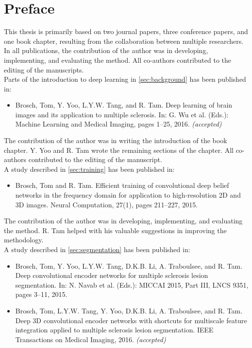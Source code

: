 \chapter*{Preface}

This thesis is primarily based on two journal papers, three conference
papers, and one book chapter, resulting from the collaboration between multiple
researchers. In all publications, the contribution of the author was in
developing, implementing, and evaluating the method. All co-authors
contributed to the editing of the manuscripts.
\\[1em]
Parts of the introduction to deep learning in \ref{sec:background} has been
published in:
\begin{itemize}
\item Brosch, Tom, Y. Yoo, L.Y.W. Tang, and R. Tam.
Deep learning of brain images and its application to multiple sclerosis.
In: G. Wu et al. (Eds.): Machine Learning and Medical Imaging, pages 1--25,
2016. \emph{(accepted)}
\end{itemize}
The contribution of the author was in writing the introduction of the book
chapter. Y. Yoo and R. Tam wrote the remaining sections of the chapter. All
co-authors contributed to the editing of the manuscript.
\\[1em]
A study described in \ref{sec:training} has been published in:
\begin{itemize}
\item Brosch, Tom and R. Tam. Efficient training of convolutional deep
belief networks in the frequency domain for application to high-resolution 2D
and 3D images. Neural Computation, 27(1), pages 211--227, 2015.
\end{itemize}
The contribution of the author was in developing, implementing, and evaluating
the method. R. Tam helped with his valuable suggestions in improving the
methodology.
\\[1em]
A study described in \ref{sec:segmentation} has been published in:
\begin{itemize}
\item Brosch, Tom, Y. Yoo, L.Y.W. Tang, D.K.B. Li, A. Traboulsee, and R. Tam.
Deep convolutional encoder networks for multiple sclerosis lesion segmentation.
In: N. Navab et al. (Eds.): MICCAI 2015, Part III, LNCS 9351, pages 3--11, 2015.
\item Brosch, Tom, L.Y.W. Tang, Y. Yoo, D.K.B. Li, A. Traboulsee, and R. Tam.
Deep 3D convolutional encoder networks with shortcuts for multiscale feature
integration applied to multiple sclerosis lesion segmentation. IEEE Transactions
on Medical Imaging, 2016. \emph{(accepted)}
\end{itemize}
